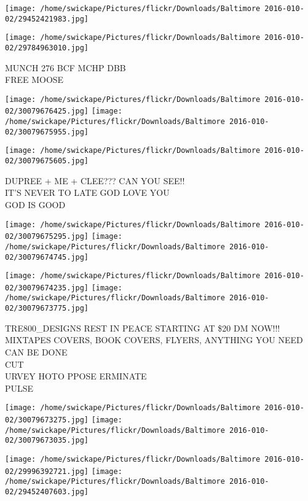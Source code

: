 \documentclass[10pt,letterpaper]{article}
\begin{document}
\texttt{[image: /home/swickape/Pictures/flickr/Downloads/Baltimore 2016-010-02/29452421983.jpg]}

\vspace{0.25in}
\texttt{[image: /home/swickape/Pictures/flickr/Downloads/Baltimore 2016-010-02/29784963010.jpg]}

MUNCH 276 BCF MCHP DBB\\
FREE MOOSE\\
\pagebreak

\texttt{[image: /home/swickape/Pictures/flickr/Downloads/Baltimore 2016-010-02/30079676425.jpg]}
\texttt{[image: /home/swickape/Pictures/flickr/Downloads/Baltimore 2016-010-02/30079675955.jpg]}

\vspace{0.25in}
\texttt{[image: /home/swickape/Pictures/flickr/Downloads/Baltimore 2016-010-02/30079675605.jpg]}

DUPREE + ME + CLEE??? CAN YOU SEE!!\\
IT'S NEVER TO LATE GOD LOVE YOU\\
GOD IS GOOD\\
\pagebreak

\texttt{[image: /home/swickape/Pictures/flickr/Downloads/Baltimore 2016-010-02/30079675295.jpg]}
\texttt{[image: /home/swickape/Pictures/flickr/Downloads/Baltimore 2016-010-02/30079674745.jpg]}

\texttt{[image: /home/swickape/Pictures/flickr/Downloads/Baltimore 2016-010-02/30079674235.jpg]}
\texttt{[image: /home/swickape/Pictures/flickr/Downloads/Baltimore 2016-010-02/30079673775.jpg]}

TRE800\_DESIGNS REST IN PEACE STARTING AT \$20 DM NOW!!! MIXTAPES COVERS, BOOK COVERS, FLYERS, ANYTHING YOU NEED CAN BE DONE\\
CUT\\
URVEY HOTO PPOSE ERMINATE\\
PULSE\\
\pagebreak

\texttt{[image: /home/swickape/Pictures/flickr/Downloads/Baltimore 2016-010-02/30079673275.jpg]}
\texttt{[image: /home/swickape/Pictures/flickr/Downloads/Baltimore 2016-010-02/30079673035.jpg]}

\texttt{[image: /home/swickape/Pictures/flickr/Downloads/Baltimore 2016-010-02/29996392721.jpg]}
\texttt{[image: /home/swickape/Pictures/flickr/Downloads/Baltimore 2016-010-02/29452407603.jpg]}
\end{document}
